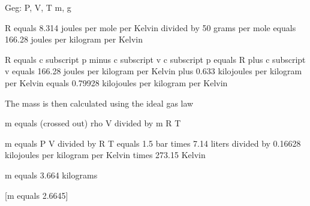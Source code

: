 Geg: P, V, T
m, g

R equals 8.314 joules per mole per Kelvin divided by 50 grams per mole equals 166.28 joules per kilogram per Kelvin

R equals c subscript p minus c subscript v
c subscript p equals R plus c subscript v equals 166.28 joules per kilogram per Kelvin plus 0.633 kilojoules per kilogram per Kelvin equals 0.79928 kilojoules per kilogram per Kelvin

The mass is then calculated using the ideal gas law

m equals (crossed out) rho V divided by m R T

m equals P V divided by R T equals 1.5 bar times 7.14 liters divided by 0.16628 kilojoules per kilogram per Kelvin times 273.15 Kelvin

m equals 3.664 kilograms

[m equals 2.6645]